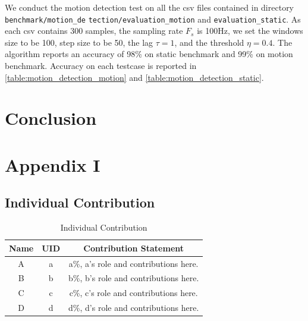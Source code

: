 We conduct the motion detection test on all the csv files contained in directory \texttt{benchmark/motion\_de} \texttt{tection/evaluation\_motion} and \texttt{evaluation\_static}. As each csv contains 300 samples, the sampling rate $F_s$ is 100Hz, we set the windows size to be 100, step size to be 50, the lag $\tau = 1$, and the threshold $\eta = 0.4$. The algorithm reports an accuracy of 98\% on static benchmark and 99\% on motion benchmark. Accuracy on each testcase is reported in \autoref{table:motion_detection_motion} and \autoref{table:motion_detection_static}.





\section{Conclusion}



\appendix
\section{Appendix I}
\subsection{Individual Contribution}

\begin{table}[!h]
\centering
\caption{Individual Contribution}
\label{individual contribution}
    \begin{tabular}{ccc}
    \toprule
    \textbf{Name} & \textbf{UID} & \textbf{Contribution Statement} \\
    \midrule
    A & a & a\%, a's role and contributions here. \\
    B & b & b\%, b's role and contributions here. \\
    C & c & c\%, c's role and contributions here. \\
    D & d & d\%, d's role and contributions here. \\
    \bottomrule
    \end{tabular}
\end{table}

